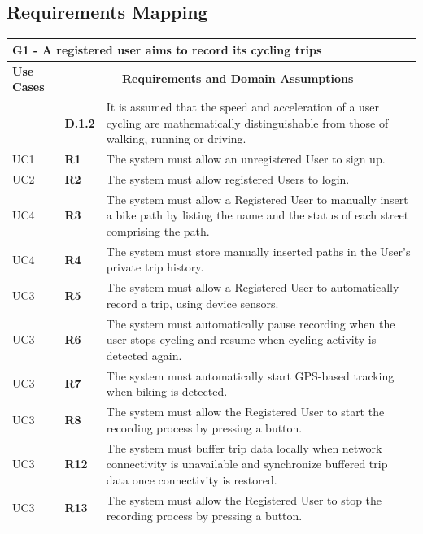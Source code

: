 \subsection{Requirements Mapping}

\begin{longtable}{|p{2.5cm}|p{1cm}|p{10.5cm}|}
\hline
\multicolumn{3}{|p{14.5cm}|}{\centering \textbf{G1 - A registered user aims to record its cycling trips}} \\
\hline
\textbf{Use Cases} & \multicolumn{2}{c|}{\textbf{Requirements and Domain Assumptions}} \\
\hline
& \textbf{D.1.2} & It is assumed that the speed and acceleration of a user cycling are mathematically distinguishable from those of walking, running or driving. \\
\hline
UC1 & \textbf{R1} & The system must allow an unregistered User to sign up. \\
\hline
UC2 & \textbf{R2} & The system must allow registered Users to login. \\
\hline
UC4 & \textbf{R3} & The system must allow a Registered User to manually insert a bike path by listing the name and the status of each street comprising the path. \\
\hline
UC4 & \textbf{R4} & The system must store manually inserted paths in the User's private trip history. \\
\hline
UC3 & \textbf{R5} & The system must allow a Registered User to automatically record a trip, using device sensors. \\
\hline
UC3 & \textbf{R6} & The system must automatically pause recording when the user stops cycling and resume when cycling activity is detected again. \\
\hline
UC3 & \textbf{R7} & The system must automatically start GPS-based tracking when biking is detected. \\
\hline
UC3 & \textbf{R8} & The system must allow the Registered User to start the recording process by pressing a button. \\
\hline
UC3 & \textbf{R12} & The system must buffer trip data locally when network connectivity is unavailable and synchronize buffered trip data once connectivity is restored. \\
\hline
UC3 & \textbf{R13} & The system must allow the Registered User to stop the recording process by pressing a button. \\
\hline
\end{longtable}

